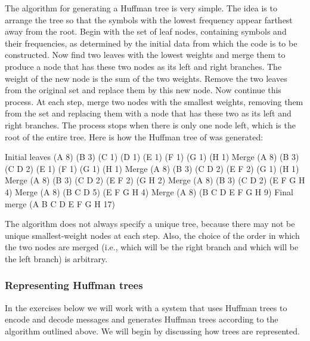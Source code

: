 The algorithm for generating a Huffman tree is very simple.
The idea is to arrange the tree so that the symbols with the lowest frequency appear farthest away from the root.
Begin with the set of leaf nodes, containing symbols and their frequencies, as determined by the initial data from which the code is to be constructed.
Now find two leaves with the lowest weights and merge them to produce a node that has these two nodes as its left and right branches.
The weight of the new node is the sum of the two weights.
Remove the two leaves from the original set and replace them by this new node.
Now continue this process.
At each step, merge two nodes with the smallest weights, removing them from the set and replacing them with a node that has these two as its left and right branches.
The process stops when there is only one node left, which is the root of the entire tree.
Here is how the Huffman tree of  was generated:
\begin{example}
	Initial leaves  {(A 8) (B 3) (C 1) (D 1) (E 1) (F 1) (G 1) (H 1)}
	         Merge  {(A 8) (B 3) ({C D} 2) (E 1) (F 1) (G 1) (H 1)}
	         Merge  {(A 8) (B 3) ({C D} 2) ({E F} 2) (G 1) (H 1)}
	         Merge  {(A 8) (B 3) ({C D} 2) ({E F} 2) ({G H} 2)}
	         Merge  {(A 8) (B 3) ({C D} 2) ({E F G H} 4)}
	         Merge  {(A 8) ({B C D} 5) ({E F G H} 4)}
	         Merge  {(A 8) ({B C D E F G H} 9)}
	   Final merge  {({A B C D E F G H} 17)}
\end{example}
The algorithm does not always specify a unique tree, because there may not be unique smallest-weight nodes at each step.
Also, the choice of the order in which the two nodes are merged (i.e., which will be the right branch and which will be the left branch) is arbitrary.



\subsubsection*{Representing Huffman trees}

In the exercises below we will work with a system that uses Huffman trees to encode and decode messages and generates Huffman trees according to the algorithm outlined above.
We will begin by discussing how trees are represented.


